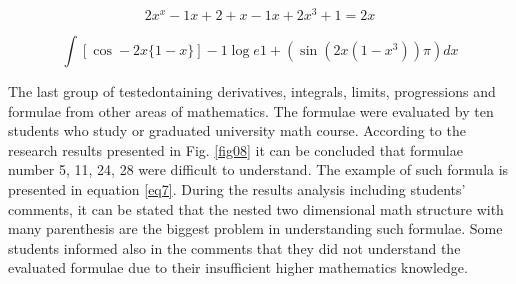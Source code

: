 \documentclass[12pt,1p]{elsarticle}
\begin{document}
\begin{equation}
\label{eq6}
2x^x - 1x + 2 + x - 1x +2x^3 + 1 = 2x
\end{equation}

\begin{equation}
\label{eq7}
\int [ \cos - 2x\{1 - x\}] - 1 \log e{1+( \sin (2x(1-x^3)) \pi )}dx
\end{equation}

	The last group of testedontaining derivatives, integrals, limits, progressions and formulae from other areas of mathematics. The formulae were evaluated by ten students who study or graduated university math course. According to the research results presented in Fig. \ref{fig08} it can be concluded that formulae number 5, 11, 24, 28 were difficult to understand. The example of such formula is presented in equation \ref{eq7}. During the results analysis including students' comments, it can be stated that the nested two dimensional math structure with many parenthesis are the biggest problem in understanding such formulae. Some students informed also in the comments that they did not understand the evaluated formulae due to their insufficient higher mathematics knowledge.
\end{document}

